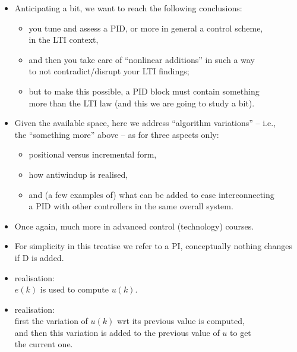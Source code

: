 \begin{frame}
\framesubtitleTC{}
\myPause
 \begin{itemize}[<+-| alert@+>]
 \item Anticipating a bit, we want to reach the following conclusions:
       \begin{itemize}[<+-| alert@+>]
       \item you tune and assess a PID, or more in general a control scheme,\\
             in the LTI context,
       \item and then you take care of ``nonlinear additions'' in such a way\\
             to not contradict/disrupt your LTI findings;
       \item but to make this possible, a PID block must contain something\\
             more than the LTI law (and this we are going to study a bit).
       \end{itemize}
 \item Given the available space, here we address ``algorithm variations'' -- i.e.,\\
       the ``something more'' above -- as for three aspects only:
       \begin{itemize}[<+-| alert@+>]
       \item positional versus incremental form,
       \item how antiwindup is realised,
       \item and (a few examples of) what can be added to ease interconnecting\\
             a PID with other controllers in the same overall system.
       \end{itemize}
 \item \vfill Once again, much more in advanced control (technology) courses.
 \end{itemize}
\end{frame}

\begin{frame}
\myPause
 \begin{itemize}[<+-| alert@+>]
 \item For simplicity in this treatise we refer to a PI, conceptually nothing changes\\
       if D is added.
 \item \vspace{2mm}  realisation:\\
       $e(k)$ is used to compute $u(k)$.
 \item \vspace{2mm}  realisation:\\
       first the variation of $u(k)$ wrt its previous value is computed,\\
       and then this variation is added to the previous value of $u$ to get\\
       the current one.
 \end{itemize}
\end{frame}

